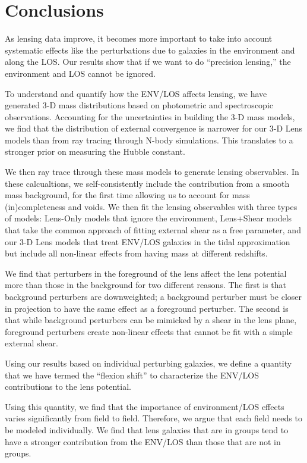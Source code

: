 \documentclass{emulateapj}
\begin{document}
\section{Conclusions}

As lensing data improve, it becomes more important to take into account systematic effects like the perturbations due to galaxies in the environment and along the LOS. Our results show that if we want to do ``precision lensing,'' the environment and LOS cannot be ignored.

To understand and quantify how the ENV/LOS affects lensing, we have generated 3-D mass distributions based on photometric and spectroscopic observations. Accounting for the uncertainties in building the 3-D mass models, we find that the distribution of external convergence is narrower for our 3-D Lens models than from ray tracing through N-body simulations. This translates to a stronger prior on measuring the Hubble constant. 

We then ray trace through these mass models to generate lensing observables. In these calcualtions, we self-consistently include the contribution from a smooth mass background, for the first time allowing us to account for mass (in)completeness and voids. We then fit the lensing observables with three types of models: Lens-Only models that ignore the environment, Lens+Shear models that take the common approach of fitting external shear as a free parameter, and our 3-D Lens models that treat ENV/LOS galaxies in the tidal approximation but include all non-linear effects from having mass at different redshifts.

We find that perturbers in the foreground of the lens affect the lens potential more than those in the background for two different reasons. The first is that background perturbers are downweighted; a background perturber must be closer in projection to have the same effect as a foreground perturber. The second is that while background perturbers can be mimicked by a shear in the lens plane, foreground perturbers create non-linear effects that cannot be fit with a simple external shear.

Using our results based on individual perturbing galaxies, we define a quantity that we have termed the ``flexion shift'' to characterize the ENV/LOS contributions to the lens potential.

Using this quantity, we find that the importance of environment/LOS effects varies significantly from field to field. Therefore, we argue that each field needs to be modeled individually. We find that lens galaxies that are in groups tend to have a stronger contribution from the ENV/LOS than those that are not in groups. 
\end{document}
